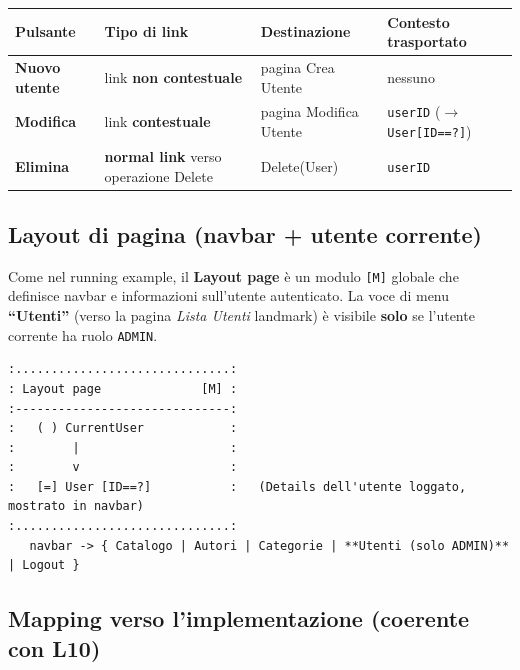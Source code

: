 \documentclass[11pt,a4paper]{article}
\newcommand{\code}[1]{\texttt{\small #1}}
\begin{document}
\begin{tabularx}{\textwidth}{>{\bfseries}p{2.6cm} p{3.6cm} p{3.4cm} X}
\toprule
\normalfont Pulsante & \normalfont Tipo di link & \normalfont Destinazione & \normalfont Contesto trasportato \\
\midrule
Nuovo utente & link \textbf{non contestuale} & pagina Crea Utente & nessuno \\
Modifica & link \textbf{contestuale} & pagina Modifica Utente & \code{userID} ($\rightarrow$ \code{User[ID==?]}) \\
Elimina & \textbf{normal link} verso operazione Delete & Delete(User) & \code{userID} \\
\bottomrule
\end{tabularx}
\renewcommand{\arraystretch}{1}

\subsection{Layout di pagina (navbar + utente corrente)}

Come nel running example, il \textbf{Layout page} è un modulo \code{[M]} globale
che definisce navbar e informazioni sull'utente autenticato. La voce di menu
\textbf{``Utenti''} (verso la pagina \emph{Lista Utenti} landmark) è visibile
\textbf{solo} se l'utente corrente ha ruolo \code{ADMIN}.

\begin{lstlisting}[style=diagram]
:..............................:
: Layout page              [M] :
:------------------------------:
:   ( ) CurrentUser            :
:        |                     :
:        v                     :
:   [=] User [ID==?]           :   (Details dell'utente loggato, mostrato in navbar)
:..............................:
   navbar -> { Catalogo | Autori | Categorie | **Utenti (solo ADMIN)** | Logout }
\end{lstlisting}

\subsection{Mapping verso l'implementazione (coerente con L10)}
\end{document}
